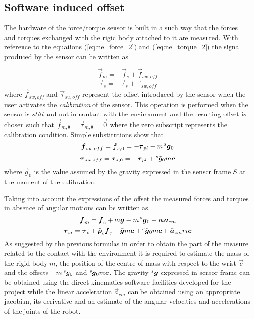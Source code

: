 \subsection{Software induced offset}
The hardware of the force/torque sensor is built in a such way that the forces and torques exchanged
with the rigid body attached to it are measured. With reference to the equations (\ref{eq:ne_force_2})
and (\ref{eq:ne_torque_2}) the signal produced by the sensor can be written as

\[
\vec{f}_{m} = -\vec{f}_{s} + \vec{f}_{sw,off}
\]
\[
\vec{\tau}_{s} = -\vec{\tau}_{s} + \vec{\tau}_{sw,off}
\]
where $\vec{f}_{sw, off}$ and $\vec{\tau}_{sw,off}$ represent the offset introduced by
the sensor when the user activates the \emph{calibration} of the sensor. This operation
is performed when the sensor is \emph{still} and not in contact with the environment
and the resulting offset is chosen such that $\vec{f}_{m,0} = \vec{\tau}_{m,0} = \vec{0}$
where the zero subscript represents the calibration condition. Simple substitutions show that
\[
\vec{f}_{sw,off} = \vec{f}_{s,0} = -\vec{\tau}_{pl} -m \prescript{s}{}{ \vec{g}}_{0}
\]
\[
\vec{\tau}_{sw,off} = \vec{\tau}_{s,0} = -\vec{\tau}_{pl} + \prescript{s}{}{ \tilde{\vec{g}}}_{0} m\vec{c}
\]
where $\vec{g}_{0}$ is the value assumed by the gravity expressed in the sensor frame $S$ at the
moment of the calibration.
\par
Taking into account the expressions of the offset the measured forces and torques in absence of angular
motions can be written as
\begin{equation}
  \label{eq:m_force_2}
  \vec{f}_{m} = \vec{f}_{c} +m \vec{g} -m \prescript{s}{}{ \vec{g}}_{0} - m  \vec{a}_{cm}
\end{equation}
\begin{equation}
  \label{eq:m_torque_2}
  \vec{\tau}_{m} = \vec{\tau}_{c} + \tilde{\vec{p}}_{c}  \vec{f}_{c}
  - \tilde{\vec{g}} m\vec{c} + \prescript{s}{}{ \tilde{\vec{g}}}_{0} m\vec{c} +  \tilde{\vec{a}}_{cm} m  \vec{c}
\end{equation}
As suggested by the previous formulas in order to obtain the part of the measure related to the contact
with the environment it is required to estimate the mass of the rigid body $m$, the position of the centre of
mass with respect to the wrist $\vec{c}$ and the offsets $-m \prescript{s}{}{ \vec{g}}_{0}$
and $\prescript{s}{}{ \tilde{\vec{g}}}_{0} m\vec{c}$.
The gravity $\prescript{s}{}{ \vec{g}}$ expressed in sensor frame can be obtained using the direct kinematics software facilities
developed for the project while the linear acceleration $\vec{a}_{cm}$ can be obtained using an appropriate
jacobian, its derivative and an estimate of the angular velocities and accelerations of the joints
of the robot.


